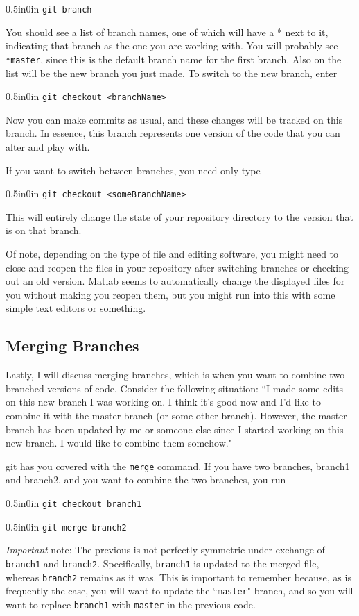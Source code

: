 \documentclass[11pt]{article}
\newcommand{\code}[1]{\begin{adjustwidth}{0.5in}{0in}
    \texttt{#1}
    \end{adjustwidth}}
\begin{document}
\code{git branch}

You should see a list of branch names, one of which will have a * next to it, indicating that branch as the one you are working with.  You will probably see \texttt{*master}, since this is the default branch name for the first branch.  Also on the list will be the new branch you just made.  To switch to the new branch, enter

\code{git checkout <branchName>}

Now you can make commits as usual, and these changes will be tracked on this branch.  In essence, this branch represents one version of the code that you can alter and play with. 

If you want to switch between branches, you need only type

\code{git checkout <someBranchName>}

This will entirely change the state of your repository directory to the version that is on that branch.  

Of note, depending on the type of file and editing software, you might need to close and reopen the files in your repository after switching branches or checking out an old version.  Matlab seems to automatically change the displayed files for you without making you reopen them, but you might run into this with some simple text editors or something.

\subsection{Merging Branches}
\label{sec:Merging}

Lastly, I will discuss merging branches, which is when you want to combine two branched versions of code.  Consider the following situation:  ``I made some edits on this new branch I was working on.  I think it's good now and I'd like to combine it with the master branch (or some other branch).  However, the master branch has been updated by me or someone else since I started working on this new branch.  I would like to combine them somehow."

git has you covered with the \texttt{merge} command.  If you have two branches, branch1 and branch2, and you want to combine the two branches, you run

\code{git checkout branch1}
\code{git merge branch2}

\emph{Important} note: The previous is not perfectly symmetric under exchange of \texttt{branch1} and \texttt{branch2}.  Specifically, \texttt{branch1} is updated to the merged file, whereas \texttt{branch2} remains as it was.  This is important to remember because, as is frequently the case, you will want to update the ``\texttt{master}" branch, and so you will want to replace \texttt{branch1} with \texttt{master} in the previous code.
\end{document}
